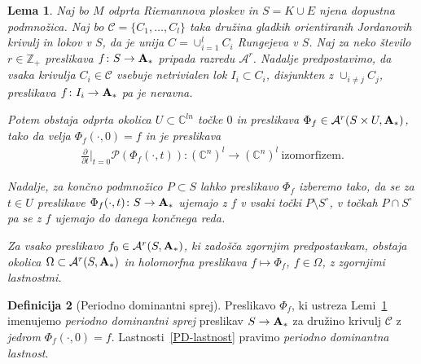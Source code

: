 \documentclass[12pt,a4paper,twoside]{article}
\theoremstyle{definition} %
\newtheorem{definicija}{Definicija}[section]
\theoremstyle{plain} %
\newtheorem{lema}[definicija]{Lema}
\numberwithin{equation}{section}  %
\newcommand{\Z}{\mathbb Z}
\newcommand{\C}{\mathbb C}
\begin{document}
\begin{lema} \label{lema:P-D-sprej}
Naj bo $M$ odprta Riemannova ploskev in $S = K \cup E$ njena dopustna podmnožica. Naj bo $\mathcal{C} = \{C_1, \dots , C_{l} \}$ taka družina gladkih orientiranih Jordanovih krivulj in lokov v $S$, da je unija $C = \cup_{i=1}^{l} C_{i}$ Rungejeva v $S$.
Naj za neko število $r \in \Z_{+}$ preslikava $f \colon S \to \textbf{\textup{A}}_{*}$ pripada razredu $\mathcal{A}^{r}$.
Nadalje predpostavimo, da vsaka krivulja $C_{i} \in \mathcal{C}$ vsebuje netrivialen lok $I_{i} \subset C_{i}$, disjunkten z $\cup_{i \neq j}C_{j}$, preslikava $f \colon I_{i} \to \textbf{\textup{A}}_{*}$ pa je neravna.

Potem obstaja odprta okolica $U \subset \C^{ln}$ točke $0$ in preslikava $\Phi_{f} \in \mathcal{A}^{r} (S \times U, \textbf{\textup{A}}_{*})$, tako da velja
$\Phi_{f}(\cdot, 0) = f$ in je preslikava
\begin{gather} \label{PD-lastnost}
	 \frac{\partial}{\partial t} \Big|_{t=0} \mathcal{P}(\Phi_{f}(\cdot, t)) \colon (\C^{n})^{l} \to (\C^{n})^{l} \ \text{izomorfizem.}
\end{gather}

Nadalje, za končno podmnožico $P \subset S$ lahko preslikavo $\Phi_{f}$ izberemo tako, da se za $t \in U$ preslikave $\Phi_{f}(\cdot, t) \colon S \to\textbf{\textup{A}}_{*}$ ujemajo z $f$ v vsaki točki $P \setminus S^\circ$, v točkah $P \cap S^\circ$ pa se z $f$ ujemajo do danega končnega reda.

Za vsako preslikavo $f_{0} \in \mathcal{A}^{r}(S, \textbf{\textup{A}}_{*})$, ki zadošča zgornjim predpostavkam, obstaja okolica $\Omega \subset \mathcal{A}^{r}(S, \textbf{\textup{A}}_{*})$ in holomorfna preslikava $f \mapsto \Phi_{f}$, $f \in \Omega$, z zgornjimi lastnostmi.
\end{lema}

\begin{definicija} [Periodno dominantni sprej]
Preslikavo $\Phi_{f}$, ki ustreza Lemi~\ref{lema:P-D-sprej} imenujemo \emph{periodno dominantni sprej} preslikav $S \to \textbf{\textup{A}}_{*}$ za družino krivulj $\mathcal{C}$ z \emph{jedrom} $\Phi_{f}(\cdot, 0) = f$. Lastnosti~\eqref{PD-lastnost} pravimo \emph{periodno dominantna lastnost}.
\end{definicija}
\end{document}
